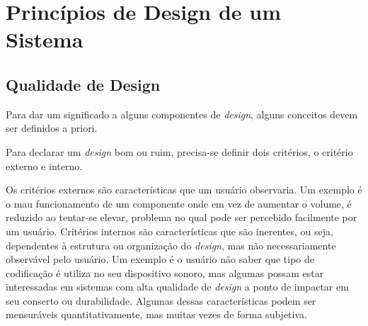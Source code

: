 \section{Princípios de Design de um Sistema}
\subsection{Qualidade de Design}

Para dar um significado a alguns componentes de \textit{design}, alguns conceitos devem ser definidos a priori.

Para declarar um \textit{design} bom ou ruim, precisa-se definir dois critérios, o critério externo e interno.

Os critérios externos são características que um usuário observaria. Um exemplo é o mau funcionamento de um componente onde em vez de aumentar o volume, é reduzido ao tentar-se elevar, problema no qual pode ser percebido facilmente por um usuário. Critérios internos são características que são inerentes, ou seja, dependentes à estrutura ou organização do \textit{design}, mas não necessariamente observável pelo usuário. Um exemplo é o usuário não saber que tipo de codificação é utiliza no seu dispositivo sonoro, mas algumas possam estar interessadas em sistemas com alta qualidade de \textit{design} a ponto de impactar em seu conserto ou durabilidade. Algumas dessas características podem ser mensuráveis quantitativamente, mas muitas vezes de forma subjetiva.

